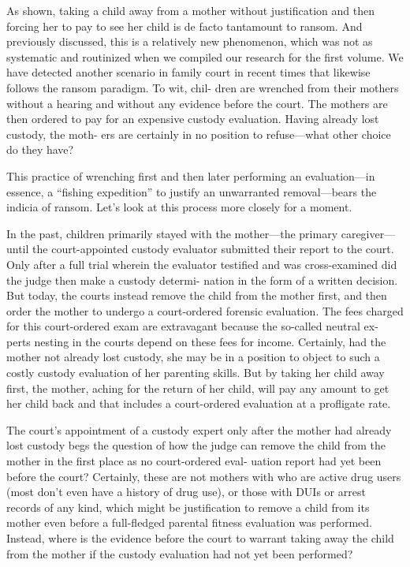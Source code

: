 As shown, taking a child away from a mother without justification and
then forcing her to pay to see her child is de facto tantamount to ransom.
And previously discussed, this is a relatively new phenomenon, which
was not as systematic and routinized when we compiled our research
for the first volume. We have detected another scenario in family court
in recent times that likewise follows the ransom paradigm. To wit, chil-
dren are wrenched from their mothers without a hearing and without
any evidence before the court. The mothers are then ordered to pay for
an expensive custody evaluation. Having already lost custody, the moth-
ers are certainly in no position to refuse—what other choice do they
have? \pfl{}

This practice of wrenching first and then later performing an
evaluation—in essence, a “fishing expedition” to justify an unwarranted
removal—bears the indicia of ransom. Let’s look at this process more
closely for a moment. \pfl{}


In the past, children primarily stayed with the mother—the primary
caregiver—until the court-appointed custody evaluator submitted their
report to the court. Only after a full trial wherein the evaluator testified
and was cross-examined did the judge then make a custody determi-
nation in the form of a written decision. But today, the courts instead
remove the child from the mother first, and then order the mother to
undergo a court-ordered forensic evaluation. The fees charged for this
court-ordered exam are extravagant because the so-called neutral ex-
perts nesting in the courts depend on these fees for income. Certainly,
had the mother not already lost custody, she may be in a position to
object to such a costly custody evaluation of her parenting skills. But
by taking her child away first, the mother, aching for the return of her
child, will pay any amount to get her child back and that includes a
court-ordered evaluation at a profligate rate. \pfl{}


The court’s appointment of a custody expert only after the mother
had already lost custody begs the question of how the judge can remove
the child from the mother in the first place as no court-ordered eval-
uation report had yet been before the court? Certainly, these are not
mothers with who are active drug users (most don’t even have a history
of drug use), or those with DUIs or arrest records of any kind, which
might be justification to remove a child from its mother even before a
full-fledged parental fitness evaluation was performed. Instead, where is
the evidence before the court to warrant taking away the child from the
mother if the custody evaluation had not yet been performed? \pfl{}


